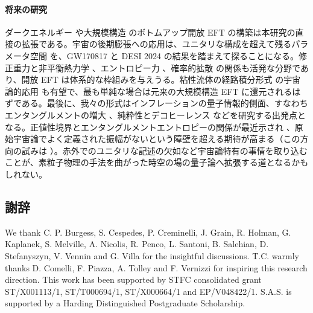 \documentclass[a4paper,11pt]{ltjsarticle}
\numberwithin{equation}{section}
\begin{document}
\paragraph{将来の研究} ダークエネルギー \cite{Gubitosi:2012hu, Piazza:2013coa, Gleyzes:2013ooa, Raveri:2014cka, Frusciante:2016xoj} や大規模構造 \cite{Baumann:2010tm, Carrasco:2012cv} のボトムアップ開放 EFT の構築は本研究の直接の拡張である。宇宙の後期膨張への応用は、ユニタリな構成を超えて残るパラメータ空間 \cite{Peirone:2017lgi, deRham:2018red, deBoe:2024gpf} を、GW170817 \cite{LIGOScientific:2017vwq, LIGOScientific:2017zic} と DESI 2024 \cite{DESI:2024mwx} の結果を踏まえて探ることになる。修正重力と非平衡熱力学 \cite{Giardino:2022sdv, Miranda:2024dhw}、エントロピー力 \cite{Garcia-Bellido:2021idr, Espinosa-Portales:2021cac, Arjona:2021uxs}、確率的拡散 \cite{Landau:2022mhm, Oppenheim:2024rcp} の関係も活発な分野であり、開放 EFT は体系的な枠組みを与えうる。粘性流体の経路積分形式 \cite{Crossley:2015evo, Liu:2018kfw} の宇宙論的応用 \cite{Ota:2024mps} も有望で、最も単純な場合は元来の大規模構造 EFT \cite{Baumann:2010tm, Carrasco:2012cv} に還元されるはずである。最後に、我々の形式はインフレーションの量子情報的側面、すなわちエンタングルメントの増大 \cite{Campo:2005sv,Lello:2013bva, Lello:2013qza, Maldacena:2015bha, Choudhury:2016cso,Martin:2016tbd,Martin:2017zxs,Bolis:2019fmq, Ando:2020kdz,Espinosa-Portales:2022yok, Adil:2022rgt,Tejerina-Perez:2024opu}、純粋性とデコヒーレンス \cite{Colas:2021llj, Burgess:2022nwu, Colas:2022kfu, Colas:2024xjy, Burgess:2024eng, Colas:2024ysu} などを研究する出発点となる。正値性境界とエンタングルメントエントロピーの関係が最近示され \cite{Cheung:2023hkq, Aoude:2024xpx}、原始宇宙論でよく定義された振幅がないという障壁を超える期待が高まる（この方向の試みは \cite{Melville:2023kgd,Donath:2024utn,Melville:2024ove}）。赤外でのユニタリな記述の欠如など宇宙論特有の事情を取り込むことが、素粒子物理の手法を曲がった時空の場の量子論へ拡張する道となるかもしれない。

\subsection*{謝辞} We thank C. P. Burgess, S. Cespedes, P. Creminelli, J. Grain, R. Holman, G. Kaplanek, S. Melville, A. Nicolis, R. Penco, L. Santoni, B. Salehian, D. Stefanyszyn, V. Vennin and G. Villa for the insightful discussions. T.C. warmly thanks D. Comelli, F. Piazza, A. Tolley and F. Vernizzi for inspiring this research direction. This work has been supported by STFC consolidated grant ST/X001113/1, ST/T000694/1, ST/X000664/1 and EP/V048422/1. S.A.S. is supported by a Harding Distinguished Postgraduate Scholarship.
\end{document}
